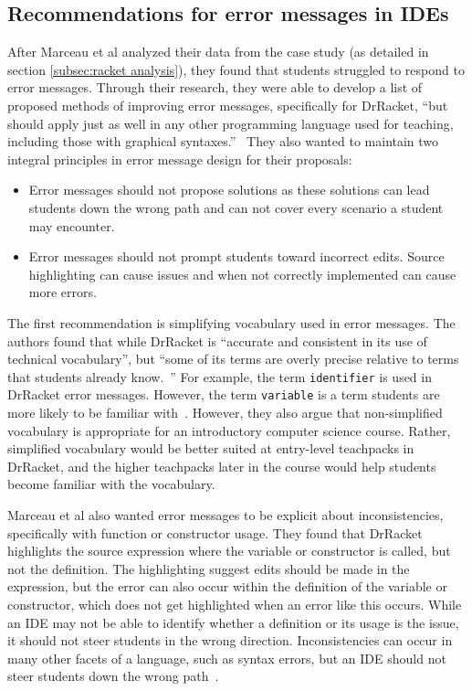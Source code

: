 \documentclass{sig-alternate}
\begin{document}
\subsection{Recommendations for error messages in IDEs}\label{subsec:error message rubric}
After Marceau et al analyzed their data from the case study (as detailed in section \ref{subsec:racket analysis}), they found that students struggled to respond to error messages.
Through their research, they were able to develop a list of proposed methods of improving error messages, specifically for DrRacket, ``but  should apply just as well in any other programming language used for teaching, including those with
graphical syntaxes.''~\cite{Marceau:2011:MYL:2048237.2048241}
They also wanted to maintain two integral principles in error message design for their proposals:

\begin{itemize}
	\item Error messages should not propose solutions as these solutions can lead students down the wrong path and can not cover every scenario a student may encounter.
	\item Error messages should not prompt students toward incorrect edits. Source highlighting can cause issues and when not correctly implemented can cause more errors.
\end{itemize}

The first recommendation is simplifying vocabulary used in error messages.
The authors found that while DrRacket is ``accurate and consistent in its use of technical vocabulary'', but ``some of its terms are overly precise relative to terms that students already know.~\cite{Marceau:2011:MYL:2048237.2048241}''
For example, the term \texttt{identifier} is used in DrRacket error messages. However, the term \texttt{variable} is a term students are more likely to be familiar with~\cite{Marceau:2011:MYL:2048237.2048241}.
However, they also argue that non-simplified vocabulary is appropriate for an introductory computer science course.
Rather, simplified vocabulary would be better suited at entry-level teachpacks in DrRacket, and the higher teachpacks later in the course would help students become familiar with the vocabulary.

Marceau et al also wanted error messages to be explicit about inconsistencies, specifically with function or constructor usage.
They found that DrRacket highlights the source expression where the variable or constructor is called, but not the definition.
The highlighting suggest edits should be made in the expression, but the error can also occur within the definition of the variable or constructor, which does not get highlighted when an error like this occurs.
While an IDE may not be able to identify whether a definition or its usage is the issue, it should not steer students in the wrong direction.
Inconsistencies can occur in many other facets of a language, such as syntax errors, but an IDE should not steer students down the wrong path~\cite{Marceau:2011:MYL:2048237.2048241}.
\end{document}

